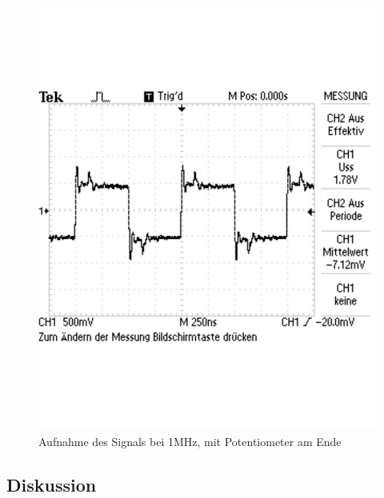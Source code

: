 \documentclass[12pt,a4paper]{article}
\begin{document}
\begin{figure}[H] 
  \centering
    \includegraphics[scale = 0.5]{3_5.pdf}
  	\caption[Aufnahme des Signals bei 1MHz, mit Potentiometer am Ende]{Aufnahme des Signals bei 1MHz, mit Potentiometer am Ende}
  \label{fig:3_5}
\end{figure}

\subsection{Diskussion}
\end{document}
